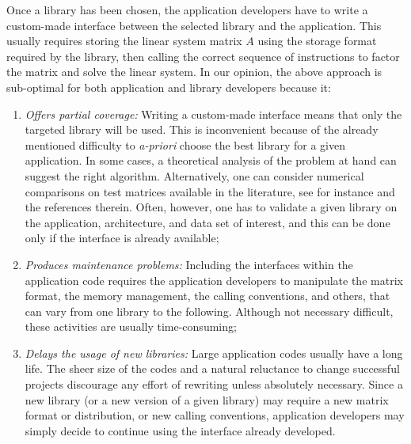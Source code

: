 \documentclass[acmtoms,acmnow]{acmtrans2m}
\begin{document}
Once a library has been chosen, the application developers have to
write a custom-made interface between the selected library and
the application. This usually requires storing the linear system matrix $A$
using the
  storage format required by the library, then calling the correct sequence of
  instructions to factor the matrix and solve the linear system.  In our
  opinion, the above approach is sub-optimal for both application and library
  developers because it:
\begin{enumerate}

\item
{\sl Offers partial coverage:} Writing a custom-made interface means
that only the targeted library will be used. This is inconvenient
because of the already mentioned difficulty to {\it a-priori} choose
the best library for a given application. In some cases, a
theoretical analysis of the problem at hand can suggest the right
algorithm. Alternatively, one can consider numerical comparisons on
test matrices available in the literature, see for instance
\cite{amestoy01analysis,gupta01recent,golub05numerical} and the
references therein. Often, however, one has to validate a given
library on the application, architecture, and data set of interest,
and this can be done only if the interface is already available;

\item
{\sl Produces maintenance problems:} Including the interfaces within
the application code requires the application developers to
manipulate the matrix format, the memory management, the calling
conventions, and others, that can vary from one library to the
following. Although not necessary difficult, these activities are
usually time-consuming;

\item
{\sl Delays the usage of new libraries:} Large application codes
usually have a long life.  The sheer size of the codes and a natural
reluctance to change successful projects discourage any effort of
rewriting unless absolutely necessary. Since a new library (or a new
version of a given library) may require a new matrix format or
distribution, or new calling conventions, application developers may
simply decide to continue using the interface already developed.
\end{enumerate}
\end{document}
